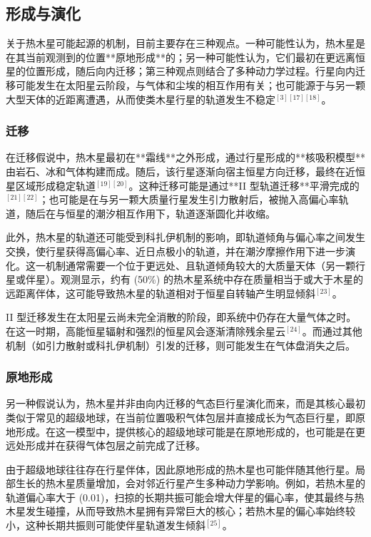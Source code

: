 \subsection{形成与演化}

关于热木星可能起源的机制，目前主要存在三种观点。一种可能性认为，热木星是在其当前观测到的位置**原地形成**的；另一种可能性认为，它们最初在更远离恒星的位置形成，随后向内迁移；第三种观点则结合了多种动力学过程。行星向内迁移可能发生在太阳星云阶段，与气体和尘埃的相互作用有关；也可能源于与另一颗大型天体的近距离遭遇，从而使类木星行星的轨道发生不稳定$^{[3][17][18]}$。
\subsubsection{迁移}
在迁移假说中，热木星最初在**霜线**之外形成，通过行星形成的**核吸积模型**由岩石、冰和气体构建而成。随后，该行星逐渐向宿主恒星方向迁移，最终在近恒星区域形成稳定轨道$^{[19][20]}$。这种迁移可能是通过**II 型轨道迁移**平滑完成的$^{[21][22]}$；也可能是在与另一颗大质量行星发生引力散射后，被抛入高偏心率轨道，随后在与恒星的潮汐相互作用下，轨道逐渐圆化并收缩。

此外，热木星的轨道还可能受到科扎伊机制的影响，即轨道倾角与偏心率之间发生交换，使行星获得高偏心率、近日点极小的轨道，并在潮汐摩擦作用下进一步演化。这一机制通常需要一个位于更远处、且轨道倾角较大的大质量天体（另一颗行星或伴星）。观测显示，约有 (50\%) 的热木星系统中存在质量相当于或大于木星的远距离伴体，这可能导致热木星的轨道相对于恒星自转轴产生明显倾斜$^{[23]}$。

II 型迁移发生在太阳星云尚未完全消散的阶段，即系统中仍存在大量气体之时。在这一时期，高能恒星辐射和强烈的恒星风会逐渐清除残余星云$^{[24]}$。而通过其他机制（如引力散射或科扎伊机制）引发的迁移，则可能发生在气体盘消失之后。
\subsubsection{原地形成}
另一种假说认为，热木星并非由向内迁移的气态巨行星演化而来，而是其核心最初类似于常见的超级地球，在当前位置吸积气体包层并直接成长为气态巨行星，即原地形成。在这一模型中，提供核心的超级地球可能是在原地形成的，也可能是在更远处形成并在获得气体包层之前完成了迁移。

由于超级地球往往存在行星伴体，因此原地形成的热木星也可能伴随其他行星。局部生长的热木星质量增加，会对邻近行星产生多种动力学影响。例如，若热木星的轨道偏心率大于 (0.01)，扫掠的长期共振可能会增大伴星的偏心率，使其最终与热木星发生碰撞，从而导致热木星拥有异常巨大的核心；若热木星的偏心率始终较小，这种长期共振则可能使伴星轨道发生倾斜$^{[25]}$。

